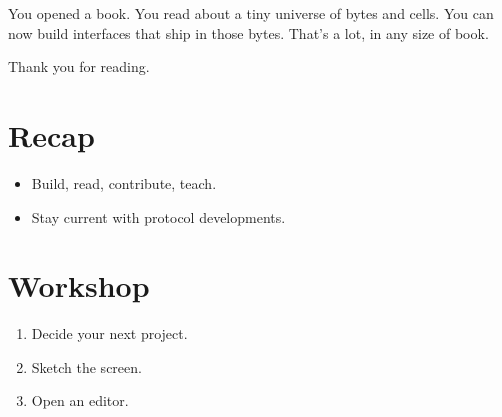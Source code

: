 You opened a book. You read about a tiny universe of
bytes and cells. You can now build interfaces that ship
in those bytes. That's a lot, in any size of book.

Thank you for reading.

\section{Recap}

\begin{recap}
\begin{itemize}[leftmargin=*]
  \item Build, read, contribute, teach.
  \item Stay current with protocol developments.
\end{itemize}
\end{recap}

\section*{Workshop}

\begin{enumerate}[leftmargin=*]
  \item Decide your next project.
  \item Sketch the screen.
  \item Open an editor.
\end{enumerate}
